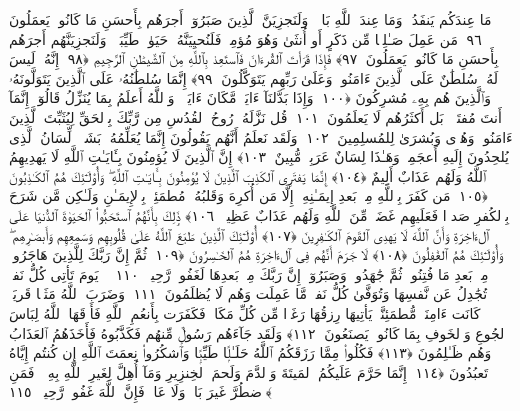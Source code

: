  مَا عِندَكُم يَنفَدُ ۖ وَمَا عِندَ ٱللَّهِ بَاقٍۢ ۗ وَلَنَجزِيَنَّ ٱلَّذِينَ صَبَرُوٓا۟ أَجرَهُم بِأَحسَنِ مَا كَانُوا۟ يَعمَلُونَ ﴿٩٦﴾
 مَن عَمِلَ صَـٰلِحًۭا مِّن ذَكَرٍ أَو أُنثَىٰ وَهُوَ مُؤمِنٌۭ فَلَنُحيِيَنَّهُۥ حَيَوٰةًۭ طَيِّبَةًۭ ۖ وَلَنَجزِيَنَّهُم أَجرَهُم بِأَحسَنِ مَا كَانُوا۟ يَعمَلُونَ ﴿٩٧﴾
 فَإِذَا قَرَأتَ ٱلقُرءَانَ فَٱستَعِذ بِٱللَّهِ مِنَ ٱلشَّيطَٰنِ ٱلرَّجِيمِ ﴿٩٨﴾
 إِنَّهُۥ لَيسَ لَهُۥ سُلطَٰنٌ عَلَى ٱلَّذِينَ ءَامَنُوا۟ وَعَلَىٰ رَبِّهِم يَتَوَكَّلُونَ ﴿٩٩﴾
 إِنَّمَا سُلطَٰنُهُۥ عَلَى ٱلَّذِينَ يَتَوَلَّونَهُۥ وَٱلَّذِينَ هُم بِهِۦ مُشرِكُونَ ﴿١٠٠﴾
 وَإِذَا بَدَّلنَآ ءَايَةًۭ مَّكَانَ ءَايَةٍۢ ۙ وَٱللَّهُ أَعلَمُ بِمَا يُنَزِّلُ قَالُوٓا۟ إِنَّمَآ أَنتَ مُفتَرٍۭ ۚ بَل أَكثَرُهُم لَا يَعلَمُونَ ﴿١٠١﴾
 قُل نَزَّلَهُۥ رُوحُ ٱلقُدُسِ مِن رَّبِّكَ بِٱلحَقِّ لِيُثَبِّتَ ٱلَّذِينَ ءَامَنُوا۟ وَهُدًۭى وَبُشرَىٰ لِلمُسلِمِينَ ﴿١٠٢﴾
 وَلَقَد نَعلَمُ أَنَّهُم يَقُولُونَ إِنَّمَا يُعَلِّمُهُۥ بَشَرٌۭ ۗ لِّسَانُ ٱلَّذِى يُلحِدُونَ إِلَيهِ أَعجَمِىٌّۭ وَهَـٰذَا لِسَانٌ عَرَبِىٌّۭ مُّبِينٌ ﴿١٠٣﴾
 إِنَّ ٱلَّذِينَ لَا يُؤمِنُونَ بِـَٔايَـٰتِ ٱللَّهِ لَا يَهدِيهِمُ ٱللَّهُ وَلَهُم عَذَابٌ أَلِيمٌ ﴿١٠٤﴾
 إِنَّمَا يَفتَرِى ٱلكَذِبَ ٱلَّذِينَ لَا يُؤمِنُونَ بِـَٔايَـٰتِ ٱللَّهِ ۖ وَأُو۟لَـٰٓئِكَ هُمُ ٱلكَـٰذِبُونَ ﴿١٠٥﴾
 مَن كَفَرَ بِٱللَّهِ مِنۢ بَعدِ إِيمَـٰنِهِۦٓ إِلَّا مَن أُكرِهَ وَقَلبُهُۥ مُطمَئِنٌّۢ بِٱلإِيمَـٰنِ وَلَـٰكِن مَّن شَرَحَ بِٱلكُفرِ صَدرًۭا فَعَلَيهِم غَضَبٌۭ مِّنَ ٱللَّهِ وَلَهُم عَذَابٌ عَظِيمٌۭ ﴿١٠٦﴾
 ذَٟلِكَ بِأَنَّهُمُ ٱستَحَبُّوا۟ ٱلحَيَوٰةَ ٱلدُّنيَا عَلَى ٱلءَاخِرَةِ وَأَنَّ ٱللَّهَ لَا يَهدِى ٱلقَومَ ٱلكَـٰفِرِينَ ﴿١٠٧﴾
 أُو۟لَـٰٓئِكَ ٱلَّذِينَ طَبَعَ ٱللَّهُ عَلَىٰ قُلُوبِهِم وَسَمعِهِم وَأَبصَـٰرِهِم ۖ وَأُو۟لَـٰٓئِكَ هُمُ ٱلغَٰفِلُونَ ﴿١٠٨﴾
 لَا جَرَمَ أَنَّهُم فِى ٱلءَاخِرَةِ هُمُ ٱلخَـٰسِرُونَ ﴿١٠٩﴾
 ثُمَّ إِنَّ رَبَّكَ لِلَّذِينَ هَاجَرُوا۟ مِنۢ بَعدِ مَا فُتِنُوا۟ ثُمَّ جَٰهَدُوا۟ وَصَبَرُوٓا۟ إِنَّ رَبَّكَ مِنۢ بَعدِهَا لَغَفُورٌۭ رَّحِيمٌۭ ﴿١١٠﴾
 ۞ يَومَ تَأتِى كُلُّ نَفسٍۢ تُجَٰدِلُ عَن نَّفسِهَا وَتُوَفَّىٰ كُلُّ نَفسٍۢ مَّا عَمِلَت وَهُم لَا يُظلَمُونَ ﴿١١١﴾
 وَضَرَبَ ٱللَّهُ مَثَلًۭا قَريَةًۭ كَانَت ءَامِنَةًۭ مُّطمَئِنَّةًۭ يَأتِيهَا رِزقُهَا رَغَدًۭا مِّن كُلِّ مَكَانٍۢ فَكَفَرَت بِأَنعُمِ ٱللَّهِ فَأَذَٟقَهَا ٱللَّهُ لِبَاسَ ٱلجُوعِ وَٱلخَوفِ بِمَا كَانُوا۟ يَصنَعُونَ ﴿١١٢﴾
 وَلَقَد جَآءَهُم رَسُولٌۭ مِّنهُم فَكَذَّبُوهُ فَأَخَذَهُمُ ٱلعَذَابُ وَهُم ظَـٰلِمُونَ ﴿١١٣﴾
 فَكُلُوا۟ مِمَّا رَزَقَكُمُ ٱللَّهُ حَلَـٰلًۭا طَيِّبًۭا وَٱشكُرُوا۟ نِعمَتَ ٱللَّهِ إِن كُنتُم إِيَّاهُ تَعبُدُونَ ﴿١١٤﴾
 إِنَّمَا حَرَّمَ عَلَيكُمُ ٱلمَيتَةَ وَٱلدَّمَ وَلَحمَ ٱلخِنزِيرِ وَمَآ أُهِلَّ لِغَيرِ ٱللَّهِ بِهِۦ ۖ فَمَنِ ٱضطُرَّ غَيرَ بَاغٍۢ وَلَا عَادٍۢ فَإِنَّ ٱللَّهَ غَفُورٌۭ رَّحِيمٌۭ ﴿١١٥﴾
